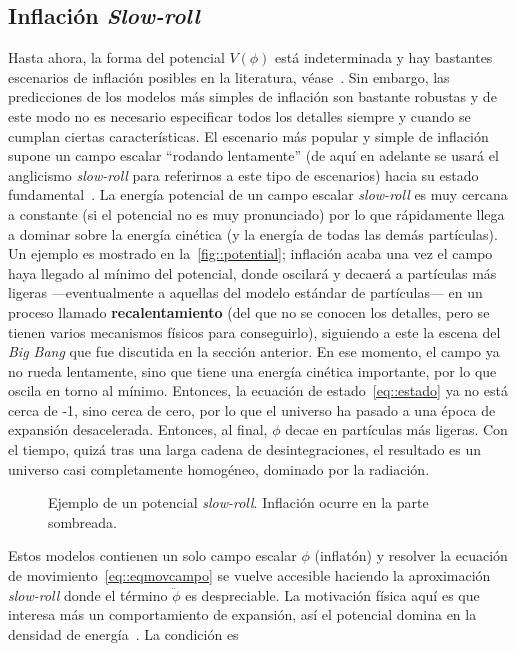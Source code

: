\subsection{Inflación \textit{Slow-roll}}
Hasta ahora, la forma del potencial \(V(\phi)\) está indeterminada y hay bastantes escenarios de inflación posibles en la literatura, véase~\cite{liddle2000cosmological}. Sin embargo, las predicciones de los modelos más simples de inflación son bastante robustas y de este modo no es necesario especificar todos los detalles siempre y cuando se cumplan ciertas características. El escenario más popular y simple de inflación supone un campo escalar ``rodando lentamente'' (de aquí en adelante se usará el anglicismo \textit{slow-roll} para referirnos a este tipo de escenarios) hacia su estado fundamental~\cite{linde1982new,albrecht1982cosmology}. La energía potencial de un campo escalar \textit{slow-roll} es muy cercana a constante (si el potencial no es muy pronunciado) por lo que rápidamente llega a dominar sobre la energía cinética (y la energía de todas las demás partículas). Un ejemplo es mostrado en la~\autoref{fig::potential}; inflación acaba una vez el campo haya llegado al mínimo del potencial, donde oscilará y decaerá a partículas más ligeras ---eventualmente a aquellas del modelo estándar de partículas--- en un proceso llamado \textbf{recalentamiento} (del que no se conocen los detalles, pero se tienen varios mecanismos físicos para conseguirlo), siguiendo a este la escena del \textit{Big Bang} que fue discutida en la sección anterior. En ese momento, el campo ya no rueda lentamente, sino que tiene una energía cinética importante, por lo que oscila en torno al mínimo. Entonces, la ecuación de estado~\eqref{eq::estado} ya no está cerca de -1, sino cerca de cero, por lo que el universo ha pasado a una época de expansión desacelerada. Entonces, al final, \(\phi\) decae en partículas más ligeras. Con el tiempo, quizá tras una larga cadena de desintegraciones, el resultado es un universo casi completamente homogéneo, dominado por la radiación.
\begin{figure}[t]
    \centering
    \def\svgwidth{0.65\textwidth}
    
    \caption[Ejemplo de un potencial \textit{slow-roll}]{Ejemplo de un potencial \textit{slow-roll}. Inflación ocurre en la parte sombreada.}
    \label{fig::potential}
\end{figure}
\newpage
Estos modelos contienen un solo campo escalar \(\phi\) (inflatón) y resolver la ecuación de movimiento~\eqref{eq::eqmovcampo} se vuelve accesible haciendo la aproximación \textit{slow-roll} donde el término \(\ddot{\phi}\) es despreciable. La motivación física aquí es que interesa más un comportamiento de expansión, así el potencial domina en la densidad de energía~\cite{peacock1998cosmological}. La condición es
